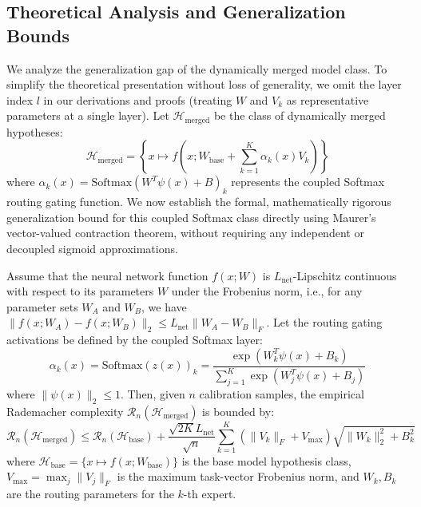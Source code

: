 \subsection{Theoretical Analysis and Generalization Bounds}
We analyze the generalization gap of the dynamically merged model class. To simplify the theoretical presentation without loss of generality, we omit the layer index $l$ in our derivations and proofs (treating $W$ and $V_k$ as representative parameters at a single layer). Let $\mathcal{H}_{\text{merged}}$ be the class of dynamically merged hypotheses:
\begin{equation}
    \mathcal{H}_{\text{merged}} = \left\{ x \mapsto f\left(x; W_{\text{base}} + \sum_{k=1}^K \alpha_k(x) V_k\right) \right\}
\end{equation}
where $\alpha_k(x) = \text{Softmax}(W^T \psi(x) + B)_k$ represents the coupled Softmax routing gating function. We now establish the formal, mathematically rigorous generalization bound for this coupled Softmax class directly using Maurer's vector-valued contraction theorem, without requiring any independent or decoupled sigmoid approximations.

\begin{theorem}
\label{thm:rademacher}
Assume that the neural network function $f(x; W)$ is $L_{\text{net}}$-Lipschitz continuous with respect to its parameters $W$ under the Frobenius norm, i.e., for any parameter sets $W_A$ and $W_B$, we have $\|f(x; W_A) - f(x; W_B)\|_2 \le L_{\text{net}} \|W_A - W_B\|_F$. Let the routing gating activations be defined by the coupled Softmax layer:
\begin{equation}
    \alpha_k(x) = \text{Softmax}(z(x))_k = \frac{\exp\left( W_k^T \psi(x) + B_k \right)}{\sum_{j=1}^K \exp\left( W_j^T \psi(x) + B_j \right)}
\end{equation}
where $\|\psi(x)\|_2 \le 1$.
Then, given $n$ calibration samples, the empirical Rademacher complexity $\mathcal{R}_n(\mathcal{H}_{\text{merged}})$ is bounded by:
\begin{equation}
    \mathcal{R}_n(\mathcal{H}_{\text{merged}}) \le \mathcal{R}_n(\mathcal{H}_{\text{base}}) + \frac{\sqrt{2K} L_{\text{net}}}{\sqrt{n}} \sum_{k=1}^K \left( \|V_k\|_F + V_{\max} \right) \sqrt{\|W_k\|_2^2 + B_k^2}
\end{equation}
where $\mathcal{H}_{\text{base}} = \{ x \mapsto f(x; W_{\text{base}}) \}$ is the base model hypothesis class, $V_{\max} = \max_{j} \|V_j\|_F$ is the maximum task-vector Frobenius norm, and $W_k, B_k$ are the routing parameters for the $k$-th expert.
\end{theorem}

